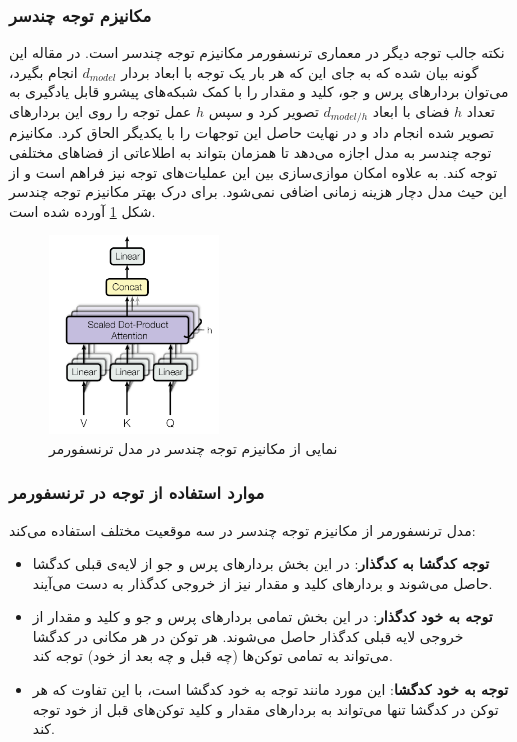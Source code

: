 \subsubsection{مکانیزم توجه چندسر}

نکته جالب توجه دیگر در معماری ترنسفورمر مکانیزم توجه چندسر است. در مقاله این گونه بیان شده که به جای این که هر بار یک توجه با ابعاد بردار 
$d_{model}$
انجام بگیرد، می‌توان بردارهای پرس و جو، کلید و مقدار را با کمک شبکه‌های پیشرو قابل یادگیری به تعداد
$h$
فضای با ابعاد
$d_{model/h}$
تصویر کرد و سپس 
$h$
عمل توجه را روی این بردار‌های تصویر شده انجام داد و در نهایت حاصل این توجهات را با یکدیگر الحاق کرد. مکانیزم توجه چندسر به مدل اجازه می‌دهد تا همزمان بتواند به اطلاعاتی از فضاهای 
مختلفی توجه کند. به علاوه امکان موازی‌سازی بین این عملیات‌های توجه نیز فراهم است و از این حیث مدل دچار هزینه زمانی اضافی نمی‌شود. برای درک بهتر مکانیزم توجه چندسر شکل 
\ref{fig:chap3:transformer_multihead}
آورده شده است.
\begin{figure}[h]
	\centering
	\includegraphics[width=0.4\textwidth]{images/chap3/transformer_multihead.png}
	\caption[نمایی از مکانیزم توجه چندسر در مدل ترنسفورمر]
	{
		نمایی از مکانیزم توجه چندسر در مدل ترنسفورمر
		\cite{transformer}
	}
	\label{fig:chap3:transformer_multihead}
\end{figure}


\subsubsection{موارد استفاده از توجه در ترنسفورمر}
مدل ترنسفورمر از مکانیزم توجه چندسر در سه موقعیت مختلف استفاده می‌کند:

\begin{itemize}
	\item 
	\textbf{توجه کدگشا به کدگذار}:
	در این بخش بردار‌های پرس و جو از لایه‌ی‌ قبلی کدگشا حاصل می‌شوند و بردارهای کلید و مقدار نیز از خروجی کدگذار به دست می‌آیند.
	
	\item 
	\textbf{توجه به خود کدگذار}:
	در این بخش تمامی بردارهای پرس و جو و کلید و مقدار از خروجی لایه قبلی کدگذار حاصل می‌شوند. هر توکن در هر مکانی در کدگشا می‌تواند به تمامی توکن‌ها (چه قبل و چه بعد از خود) توجه کند.
	
	\item
	\textbf{توجه به خود کدگشا}:
	این مورد مانند توجه به خود کدگشا است، با این تفاوت که هر توکن در کدگشا تنها می‌تواند به بردارهای مقدار و کلید توکن‌های قبل از خود توجه کند.
	
	
\end{itemize}

